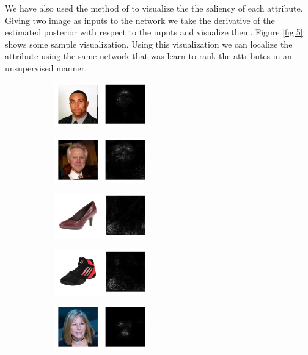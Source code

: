 We have also used the method of \cite{saliency} to visualize the the saliency of each attribute. Giving two image as inputs to the network we take the derivative of the estimated posterior with respect to the inputs and visualize them. Figure \ref{fig.5} shows some sample visualization. Using this visualization we can localize the attribute using the same network that was learn to rank the attributes in an unsupervised manner.

\begin{figure}
    \centering
    \begin{subfigure}
        \centering
        \includegraphics[width=4cm]{saliency/bald-1.jpeg}
    \end{subfigure}
    \begin{subfigure}
        \centering
        \includegraphics[width=4cm]{saliency/bald-2.jpeg}
    \end{subfigure}
    \begin{subfigure}
        \centering
        \includegraphics[width=4cm]{saliency/pointy-1.jpeg}
    \end{subfigure}
    \begin{subfigure}
        \centering
        \includegraphics[width=4cm]{saliency/pointy-2.jpeg}
    \end{subfigure}
    \begin{subfigure}
        \centering
        \includegraphics[width=4cm]{saliency/smile-1.jpeg}

\end{subfigure}
\end{figure}

